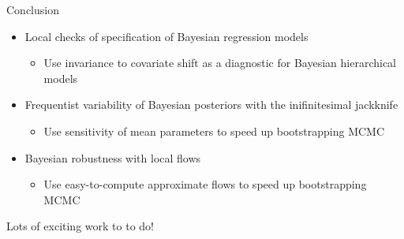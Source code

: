 \begin{frame}{Conclusion}


%
\begin{itemize}
%
\item Local checks of specification of Bayesian regression models
%
\begin{itemize}
\item Use invariance to covariate shift as a diagnostic for Bayesian hierarchical models
\end{itemize}
%
\item Frequentist variability of Bayesian posteriors with the inifinitesimal jackknife
\begin{itemize}
\item Use sensitivity of mean parameters to speed up bootstrapping MCMC
\end{itemize}
%
\item Bayesian robustness with local flows
\begin{itemize}
\item Use easy-to-compute approximate flows to speed up bootstrapping MCMC
\end{itemize}
%
\end{itemize}

\pause

\vspace{2em}
\begin{center}
Lots of exciting work to to do!
\end{center}


\authorimages{}


\end{frame}